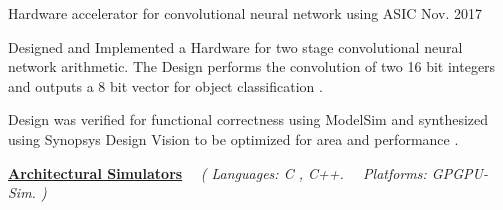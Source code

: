 \begin{cvprojects}
\begin{flushleft}
    \end{flushleft}
    \par\addvspace{0.3ex}
    \cvproject
    {Hardware accelerator for convolutional neural network using ASIC }
    {\color{darkgray}Nov. 2017}
    {
      \begin{cvprojectitems}
        \item {Designed and Implemented a Hardware for two stage convolutional neural network arithmetic. The Design performs the convolution of two 16 bit integers and outputs a 8 bit vector for object classification . }
        \item {Design was verified for functional correctness using ModelSim and synthesized using Synopsys Design Vision to be optimized for area and performance .} 
      \end{cvprojectitems}
    }

    \par\addvspace{1ex}
    \begin{flushleft}
    \par\addvspace{-1.5mm}
    \fontsize{10.4pt}{1em}\selectfont\underline{\textbf{\color{black}Architectural Simulators}} \ \ \textit{(\color{text} Languages: C , C++. \ \ Platforms: GPGPU-Sim. )}
    \end{flushleft}
    \par\addvspace{0.3ex}

\end{cvprojects}
